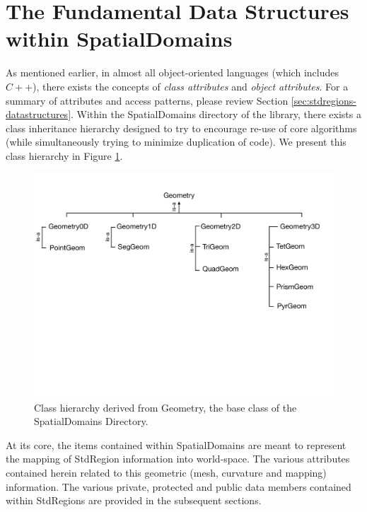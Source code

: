 %
\section{The Fundamental Data Structures within SpatialDomains}
\label{sec:spatialdomains-datastructures}

As mentioned earlier, in almost all object-oriented languages (which includes $C++$), there exists the concepts of {\em class attributes} and {\em object attributes}.   For a summary of attributes and access patterns, please review Section \ref{sec:stdregions-datastructures}.
Within the SpatialDomains directory of the library, there exists a class inheritance hierarchy designed to try to encourage re-use of core
algorithms (while simultaneously trying to minimize duplication of code).  We present this class hierarchy in Figure \ref{spatialdomains:geomtree}.


\begin{figure}[htb]
\centering
\includegraphics[width=6in]{img/geomtree.pdf}
\caption{Class hierarchy derived from Geometry, the base class of the SpatialDomains Directory.}
\label{spatialdomains:geomtree}
\end{figure}

At its core, the items contained within SpatialDomains are meant to represent the mapping of StdRegion information into world-space.  The various attributes contained herein related to this geometric (mesh, curvature and mapping) information.  The various private, protected and public data members contained within StdRegions are provided in the subsequent sections.


